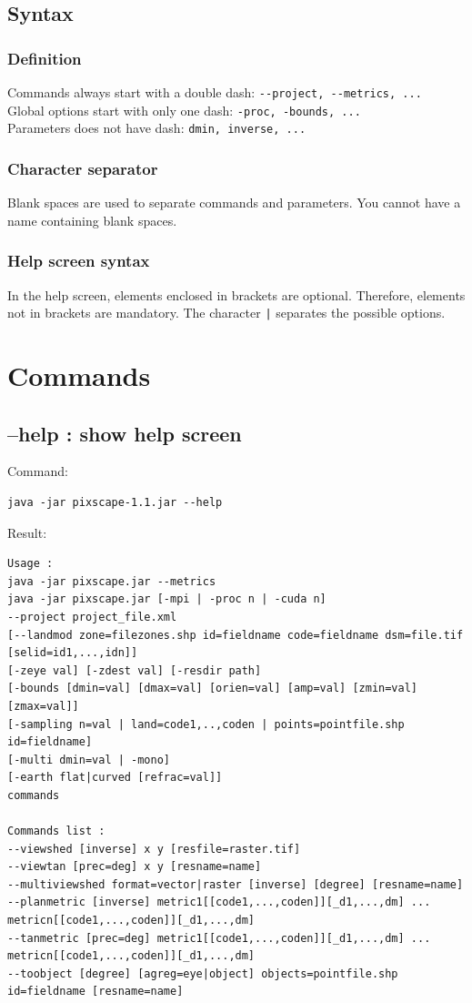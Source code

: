 \documentclass{report}
\begin{document}
\subsection{Syntax}
\subsubsection{Definition}
Commands always start with a double dash: \verb|--project, --metrics, ...|\\
Global options start with only one dash: \verb|-proc, -bounds, ...|\\
Parameters does not have dash: \verb|dmin, inverse, ...|

\subsubsection{Character separator}
Blank spaces are used to separate commands and parameters.  You cannot have a name containing blank spaces.

\subsubsection{Help screen syntax}
In the help screen, elements enclosed in brackets are optional. Therefore, elements not in brackets are mandatory. The character \verb+|+ separates the possible options.

\section{Commands}

\subsection{--help : show help screen}
Command:
\begin{Verbatim}
java -jar pixscape-1.1.jar --help
\end{Verbatim}
Result:
\begin{Verbatim}
Usage :
java -jar pixscape.jar --metrics
java -jar pixscape.jar [-mpi | -proc n | -cuda n]
--project project_file.xml
[--landmod zone=filezones.shp id=fieldname code=fieldname dsm=file.tif [selid=id1,...,idn]]
[-zeye val] [-zdest val] [-resdir path]
[-bounds [dmin=val] [dmax=val] [orien=val] [amp=val] [zmin=val] [zmax=val]]
[-sampling n=val | land=code1,..,coden | points=pointfile.shp id=fieldname]
[-multi dmin=val | -mono]
[-earth flat|curved [refrac=val]]
commands

Commands list :
--viewshed [inverse] x y [resfile=raster.tif]
--viewtan [prec=deg] x y [resname=name]
--multiviewshed format=vector|raster [inverse] [degree] [resname=name]
--planmetric [inverse] metric1[[code1,...,coden]][_d1,...,dm] ... metricn[[code1,...,coden]][_d1,...,dm]
--tanmetric [prec=deg] metric1[[code1,...,coden]][_d1,...,dm] ... metricn[[code1,...,coden]][_d1,...,dm]
--toobject [degree] [agreg=eye|object] objects=pointfile.shp id=fieldname [resname=name]
\end{Verbatim}
\end{document}
